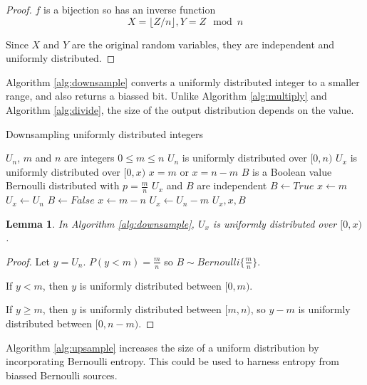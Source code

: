 \documentclass[12pt]{article}
\newtheorem{lemma}{Lemma}
\begin{document}
\begin{proof} $f$ is a bijection so has an inverse function 
\begin{equation}    
X = \lfloor Z/n \rfloor, Y = Z \mod n
\end{equation}

Since $X$ and $Y$ are the original random variables, they are independent and uniformly distributed.
\end{proof}

Algorithm \ref{alg:downsample} converts a uniformly distributed integer to a smaller range, and also returns a biassed bit. Unlike Algorithm \ref{alg:multiply} and Algorithm \ref{alg:divide}, the size of the output distribution depends on the value. 

\begin{algorithm}
\caption{Downsampling uniformly distributed integers}
\label{alg:downsample}
\begin{algorithmic}[1]
    \Require $U_{n}$, $m$ and $n$ are integers 
    \Require $0 \le m \le n$
    \Require $U_{n}$ is uniformly distributed over $[0,n)$
\Ensure $U_{x}$ is uniformly distributed over $[0,x)$
\Ensure $x = m$ or $x=n-m$
\Ensure $B$ is a Boolean value Bernoulli distributed with $p=\frac{m}{n}$
\Ensure $U_x$ and $B$ are independent
    \State $B \gets True$  
    \State $x \gets m$
    \State $U_x \gets U_n$
  \Else
    \State $B \gets False$  
    \State $x \gets m-n$
    \State $U_x \gets U_n-m$
  \EndIf
  \State \Return $U_x, x, B$
\EndProcedure
\end{algorithmic}
\end{algorithm}

\begin{lemma}
In Algorithm \ref{alg:downsample}, $U_x$ is uniformly distributed over $[0,x)$.
\end{lemma}

\begin{proof}
    Let $y = U_n$.
    $P(y<m) = \frac{m}{n}$ so $B \sim Bernoulli\{\frac{m}{n}\}$.

If $y < m$, then $y$ is uniformly distributed between $[0,m)$.

If $y \ge m$, then $y$ is uniformly distributed between $[m, n)$, so $y-m$ is uniformly distributed between $[0, n-m)$.
\end{proof}

Algorithm \ref{alg:upsample} increases the size of a uniform distribution by incorporating Bernoulli entropy. This could be used to harness entropy from biassed Bernoulli sources.
\end{document}
